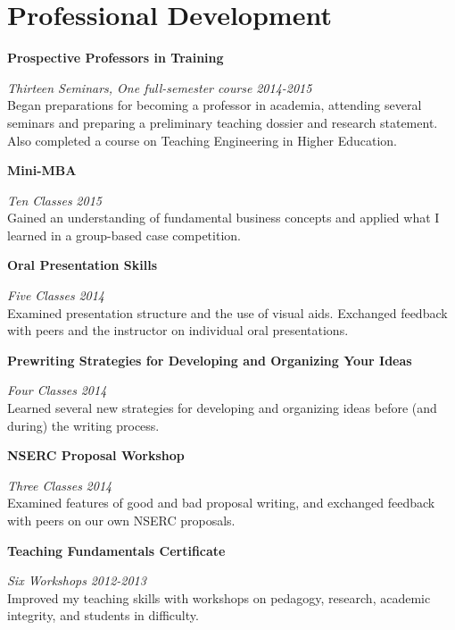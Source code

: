 \section{\sc Professional Development}

{\bf Prospective Professors in Training}
\vspace{-.3cm}

{\em Thirteen Seminars, One full-semester course} \hfill {\em 2014-2015}\\
Began preparations for becoming a professor in academia, attending several seminars and preparing a preliminary teaching dossier and research statement.
Also completed a course on Teaching Engineering in Higher Education.

{\bf Mini-MBA}
\vspace{-.3cm}

{\em Ten Classes} \hfill {\em 2015}\\
Gained an understanding of fundamental business concepts and applied what I learned in a group-based case competition.

{\bf Oral Presentation Skills}
\vspace{-.3cm}

{\em Five Classes} \hfill {\em 2014}\\
Examined presentation structure and the use of visual aids. Exchanged feedback with peers and the instructor on individual oral presentations.

\newpage
{\bf Prewriting Strategies for Developing and Organizing Your Ideas}
\vspace{-.3cm}

{\em Four Classes} \hfill {\em 2014}\\
Learned several new strategies for developing and organizing ideas before (and during) the writing process.

{\bf NSERC Proposal Workshop}
\vspace{-.3cm}

{\em Three Classes} \hfill {\em 2014}\\
Examined features of good and bad proposal writing, and exchanged feedback with peers on our own NSERC proposals.

{\bf Teaching Fundamentals Certificate}
\vspace{-.3cm}

{\em Six Workshops} \hfill {\em 2012-2013}\\
Improved my teaching skills with workshops on pedagogy, research, academic integrity, and students in difficulty.
